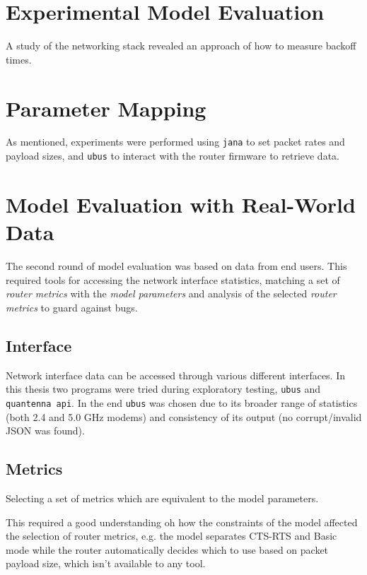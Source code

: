 \section{Experimental Model Evaluation}

A study of the networking stack revealed an approach of how to measure backoff times.

\section{Parameter Mapping}  

As mentioned, experiments were performed using \texttt{jana} to set packet
rates and payload sizes, and \texttt{ubus} to interact with the router
firmware to retrieve data.

\section{Model Evaluation with Real-World Data}

The second round of model evaluation was based on data from end users. This
required tools for accessing the network interface statistics, matching a set of
\emph{router metrics} with the \emph{model parameters} and analysis of the
selected \emph{router metrics} to guard against bugs.

\subsection{Interface}

Network interface data can be accessed through various different interfaces. In
this thesis two programs were tried during exploratory testing, \texttt{ubus}
and \texttt{quantenna api}. In the end \texttt{ubus} was chosen due to its
broader range of statistics (both 2.4 and 5.0 GHz modems) and consistency of its
output (no corrupt/invalid JSON was found).

\subsection{Metrics}
Selecting a set of metrics which are equivalent to the model parameters.

This required a good understanding oh how the constraints of the model affected
the selection of router metrics, e.g. the model separates CTS-RTS and Basic mode
while the router automatically decides which to use based on packet payload
size, which isn't available to any tool.

